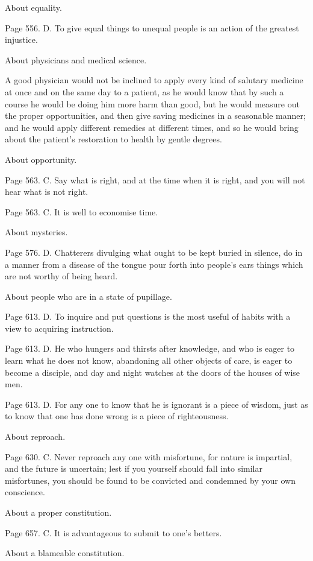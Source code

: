 About equality.

Page 556. D. To give equal things to unequal people is an action of the greatest injustice.

About physicians and medical science.

A good physician would not be inclined to apply every kind of salutary medicine at once and on the
same day to a patient, as he would know that by such a course he would be doing him more harm
than good, but he would measure out the proper opportunities, and then give saving medicines in a
seasonable manner; and he would apply different remedies at different times, and so he would
bring about the patient's restoration to health by gentle degrees.

About opportunity.

Page 563. C. Say what is right, and at the time when it is right, and you will not hear what is not
right.

Page 563. C. It is well to economise time.

About mysteries.

Page 576. D. Chatterers divulging what ought to be kept buried in silence, do in a manner from a
disease of the tongue pour forth into people's ears things which are not worthy of being heard.

About people who are in a state of pupillage.

Page 613. D. To inquire and put questions is the most useful of habits with a view to acquiring
instruction.

Page 613. D. He who hungers and thirsts after knowledge, and who is eager to learn what he does
not know, abandoning all other objects of care, is eager to become a disciple, and day and night
watches at the doors of the houses of wise men.

Page 613. D. For any one to know that he is ignorant is a piece of wisdom, just as to know that one
has done wrong is a piece of righteousness.

About reproach.

Page 630. C. Never reproach any one with misfortune, for nature is impartial, and the future is
uncertain; lest if you yourself should fall into similar misfortunes, you should be found to be
convicted and condemned by your own conscience.

About a proper constitution.

Page 657. C. It is advantageous to submit to one's betters.

About a blameable constitution.

